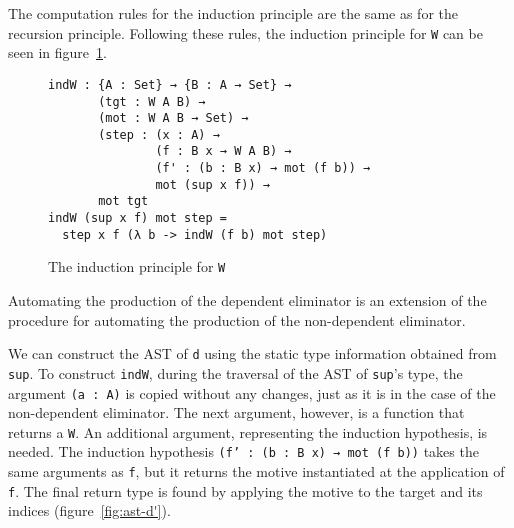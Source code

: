 \documentclass[sigplan,10pt]{acmart}
\begin{document}
The computation rules for the induction principle are the same as for the recursion principle.
Following these rules, the induction principle for \texttt{W} can be seen in figure~\ref{fig:w-ind}.

\begin{figure}
\begin{Verbatim}
indW : {A : Set} → {B : A → Set} →
       (tgt : W A B) →
       (mot : W A B → Set) →
       (step : (x : A) →
               (f : B x → W A B) →
               (f' : (b : B x) → mot (f b)) →
               mot (sup x f)) →
       mot tgt
indW (sup x f) mot step =
  step x f (λ b -> indW (f b) mot step)
\end{Verbatim}
  \caption{The induction principle for \texttt{W}}
  \label{fig:w-ind}
\end{figure}

Automating the production of the dependent eliminator is an extension of the procedure for automating the production of the non-dependent eliminator.

We can construct the AST of {\tt d} using the static type information obtained from {\tt sup}.
To construct \texttt{indW}, during the traversal of the AST of \texttt{sup}'s type, the argument {\tt (a : A)} is copied without any changes, just as it is in the case of the non-dependent eliminator.
The next argument, however, is a function that returns a \texttt{W}.
An additional argument, representing the induction hypothesis, is needed.
The induction hypothesis {\tt (f' : (b : B x) → mot (f b))} takes the same arguments as {\tt f}, but it returns the motive instantiated at the application of \texttt{f}.
The final return type is found by applying the motive to the target and its indices (figure~\ref{fig:ast-d'}).
\end{document}

